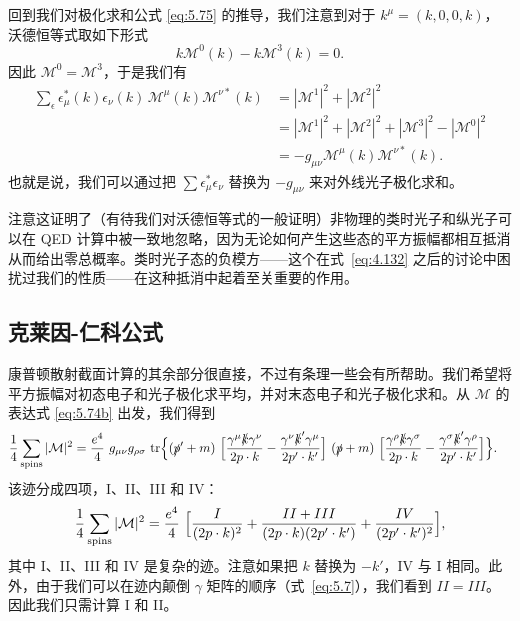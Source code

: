 回到我们对极化求和公式 \eqref{eq:5.75} 的推导，我们注意到对于 $k^\mu = (k, 0, 0, k)$，沃德恒等式取如下形式
\begin{equation}
  k\mathcal{M}^0(k) - k\mathcal{M}^3(k) = 0 .
  \label{eq:5.80}
\end{equation}
因此 $\mathcal{M}^0 = \mathcal{M}^3$，于是我们有
\begin{equation}
  \begin{aligned}
    \sum_{\epsilon} \epsilon^{*}_\mu(k)\epsilon_\nu(k)\,
      \mathcal{M}^{\mu}(k)\mathcal{M}^{\nu*}(k)
    &= |\mathcal{M}^1|^2 + |\mathcal{M}^2|^2\\
    &= |\mathcal{M}^1|^2 + |\mathcal{M}^2|^2 + |\mathcal{M}^3|^2
      - |\mathcal{M}^0|^2\\
    &= -g_{\mu\nu}\mathcal{M}^{\mu}(k)\mathcal{M}^{\nu*}(k) .
  \end{aligned}
  \label{eq:5.81}
\end{equation}
也就是说，我们可以通过把 $\sum \epsilon^{*}_\mu\epsilon_\nu$ 替换为 $-g_{\mu\nu}$ 来对外线光子极化求和。

注意这证明了（有待我们对沃德恒等式的一般证明）非物理的类时光子和纵光子可以在 QED 计算中被一致地忽略，因为无论如何产生这些态的平方振幅都相互抵消从而给出零总概率。类时光子态的负模方——这个在式~\eqref{eq:4.132} 之后的讨论中困扰过我们的性质——在这种抵消中起着至关重要的作用。

\subsection{克莱因-仁科公式}

康普顿散射截面计算的其余部分很直接，不过有条理一些会有所帮助。我们希望将平方振幅对初态电子和光子极化求平均，并对末态电子和光子极化求和。从 $\mathcal{M}$ 的表达式 \eqref{eq:5.74b} 出发，我们得到
\begin{equation}
  \begin{aligned}
    \frac{1}{4}\sum_{\text{spins}}|\mathcal{M}|^2
    &= \frac{e^4}{4}\ g_{\mu\nu}g_{\rho\sigma}\ \mathrm{tr}\Bigl\{
      (\slashed{p}'+m)\ \Bigl[
        \frac{\gamma^\mu\slashed{k}\gamma^\nu}{2p\cdot k}
        - \frac{\gamma^\nu\slashed{k}'\gamma^\mu}{2p'\cdot k'} \Bigr]\
      (\slashed{p}+m)\ \Bigl[
        \frac{\gamma^\rho\slashed{k}\gamma^\sigma}{2p\cdot k}
        - \frac{\gamma^\sigma\slashed{k}'\gamma^\rho}{2p'\cdot k'} \Bigr]
      \Bigr\} .
  \end{aligned}
  \label{eq:5.82}
\end{equation}
该迹分成四项，I、II、III 和 IV：
\begin{equation}
  \frac{1}{4}\sum_{\text{spins}}|\mathcal{M}|^2
    = \frac{e^4}{4}\ \Bigl[ \frac{I}{(2p\cdot k)^2}
      + \frac{II + III}{(2p\cdot k)(2p'\cdot k')}
      + \frac{IV}{(2p'\cdot k')^2} \Bigr],
  \label{eq:5.83}
\end{equation}
其中 I、II、III 和 IV 是复杂的迹。注意如果把 $k$ 替换为 $-k'$，IV 与 I 相同。此外，由于我们可以在迹内颠倒 $\gamma$ 矩阵的顺序（式~\eqref{eq:5.7}），我们看到 $II = III$。因此我们只需计算 I 和 II。

